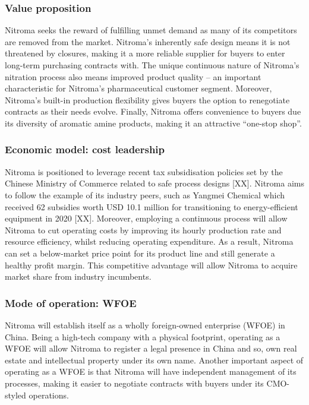 \subsubsection{Value proposition}
Nitroma seeks the reward of fulfilling unmet demand as many of its competitors are removed from the market. Nitroma’s inherently safe design means it is not threatened by closures, making it a more reliable supplier for buyers to enter long-term purchasing contracts with. The unique continuous nature of Nitroma’s nitration process also means improved product quality – an important characteristic for Nitroma’s pharmaceutical customer segment. Moreover, Nitroma’s built-in production flexibility gives buyers the option to renegotiate contracts as their needs evolve. Finally, Nitroma offers convenience to buyers due its diversity of aromatic amine products, making it an attractive “one-stop shop”.
\subsubsection{Economic model: cost leadership}
Nitroma is positioned to leverage recent tax subsidisation policies set by the Chinese Ministry of Commerce related to safe process designs [XX]. Nitroma aims to follow the example of its industry peers, such as Yangmei Chemical which received 62 subsidies worth USD 10.1 million for transitioning to energy-efficient equipment in 2020 [XX]. Moreover, employing a continuous process will allow Nitroma to cut operating costs by improving its hourly production rate and resource efficiency, whilst reducing operating expenditure. As a result, Nitroma can set a below-market price point for its product line and still generate a healthy profit margin. This competitive advantage will allow Nitroma to acquire market share from industry incumbents. 
\subsubsection{Mode of operation: WFOE}
Nitroma will establish itself as a wholly foreign-owned enterprise (WFOE) in China. Being a high-tech company with a physical footprint, operating as a WFOE will allow Nitroma to register a legal presence in China and so, own real estate and intellectual property under its own name. Another important aspect of operating as a WFOE is that Nitroma will have independent management of its processes, making it easier to negotiate contracts with buyers under its CMO-styled operations.

